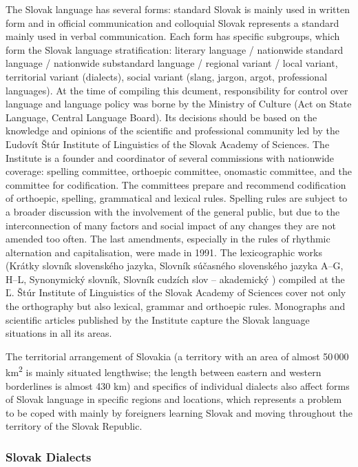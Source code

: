 \begin{multicols}{2}
The Slovak language has several forms: standard Slovak is mainly used in
written form and in official communication and colloquial Slovak represents a
standard mainly used in verbal communication. Each form has specific subgroups,
which form the Slovak language stratification: literary language / nationwide
standard language / nationwide substandard language / regional variant / local
variant, territorial variant (dialects), social variant (slang, jargon, argot,
professional languages). At the time of compiling this dcument, responsibility
for control over language and language policy was borne by the Ministry of
Culture (Act on State Language, Central Language Board). Its decisions should
be based on the knowledge and opinions of the scientific and professional
community led by the Ľudovít Štúr Institute of Linguistics of the Slovak
Academy of Sciences. The Institute is a founder and coordinator of several
commissions with nationwide coverage: spelling committee, orthoepic committee,
onomastic committee, and the committee for codification. The committees prepare
and recommend codification of orthoepic, spelling, grammatical and lexical
rules. Spelling rules are subject to a broader discussion with the involvement
of the general public, but due to the interconnection of many factors and
social impact of any changes they are not amended too often. The last
amendments, especially in the rules of rhythmic alternation and capitalisation,
were made in 1991. The lexicographic works (Krátky slovník slovenského jazyka,
Slovník súčasného slovenského jazyka A--G, H--L, Synonymický slovník,
Slovník cudzích slov – akademický
\cite{kssj2003,sssj2006,sssj2011,sss2004,scs2005}) compiled at the Ľ. Štúr Institute of
Linguistics of the Slovak Academy of Sciences cover not only the orthography
but also lexical, grammar and orthoepic rules. Monographs and scientific
articles published by the Institute capture the Slovak language situations in
all its areas. 

The territorial arrangement of Slovakia (a territory with an area of
almost 50\,000 km\textsuperscript{2} is mainly situated lengthwise; the
length between eastern and western borderlines is almost 430 km) and
specifics of individual dialects also affect forms of Slovak language in
specific regions and locations, which represents a problem to be coped
with mainly by foreigners learning Slovak and moving throughout the
territory of the Slovak Republic.


\subsubsection{Slovak Dialects}


\end{multicols}
